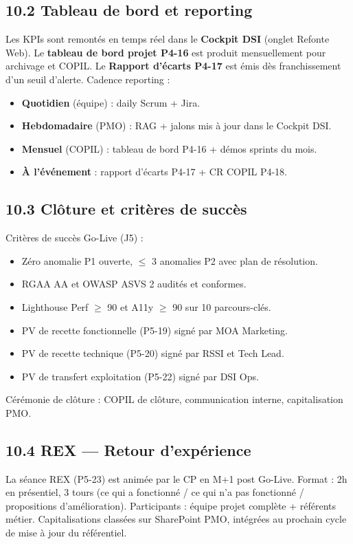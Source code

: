 \documentclass[11pt,a4paper,oneside]{report}
\begin{document}
\subsection*{10.2 Tableau de bord et reporting}
Les KPIs sont remontés en temps réel dans le \textbf{Cockpit DSI} (onglet Refonte Web). Le \textbf{tableau de bord projet P4-16} est produit mensuellement pour archivage et COPIL. Le \textbf{Rapport d'écarts P4-17} est émis dès franchissement d'un seuil d'alerte. Cadence reporting :
\begin{itemize}
  \item \textbf{Quotidien} (équipe) : daily Scrum + Jira.
  \item \textbf{Hebdomadaire} (PMO) : RAG + jalons mis à jour dans le Cockpit DSI.
  \item \textbf{Mensuel} (COPIL) : tableau de bord P4-16 + démos sprints du mois.
  \item \textbf{À l'événement} : rapport d'écarts P4-17 + CR COPIL P4-18.
\end{itemize}

\subsection*{10.3 Clôture et critères de succès}
Critères de succès Go-Live (J5) :
\begin{itemize}
  \item Zéro anomalie P1 ouverte, $\leq$ 3 anomalies P2 avec plan de résolution.
  \item RGAA AA et OWASP ASVS 2 audités et conformes.
  \item Lighthouse Perf $\geq$ 90 et A11y $\geq$ 90 sur 10 parcours-clés.
  \item PV de recette fonctionnelle (P5-19) signé par MOA Marketing.
  \item PV de recette technique (P5-20) signé par RSSI et Tech Lead.
  \item PV de transfert exploitation (P5-22) signé par DSI Ops.
\end{itemize}

Cérémonie de clôture : COPIL de clôture, communication interne, capitalisation PMO.

\subsection*{10.4 REX --- Retour d'expérience}
La séance REX (P5-23) est animée par le CP en M+1 post Go-Live. Format : 2h en présentiel, 3 tours (ce qui a fonctionné / ce qui n'a pas fonctionné / propositions d'amélioration). Participants : équipe projet complète + référents métier. Capitalisations classées sur SharePoint PMO, intégrées au prochain cycle de mise à jour du référentiel.
\end{document}
